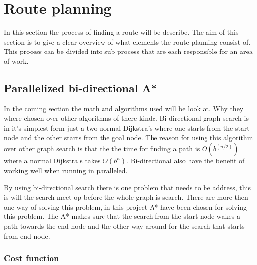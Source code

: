 \section{Route planning}
In this section the process of finding a route will be describe.
The aim of this section is to give a clear overview of what elements the route planning consist of.
This process can be divided into sub process that are each responsible for an area of work.

\subsection{Parallelized bi-directional A*} \label{algorithms}

In the coming section the math and algorithms used will be look at. Why they where chosen over other algorithms of there kinde.
Bi-directional graph search is in it's simplest form just a two normal Dijkstra’s where one starts from the start node and the other starts from the goal node.
The reason for using this algorithm over other graph search is that the the time for finding a path is $O(b^{(n/2)})$ where a normal Dijkstra’s takes $O(b^{n})$. Bi-directional also have the benefit of working well when running in paralleled.



By using bi-directional search there is one problem that needs to be address, this is will the search meet op before the whole graph is search. There are more then one way of solving this problem, in this project A* have been chosen for solving this problem. The A* makes sure that the search from the start node wakes a path towards the end node and the other way around for the search that starts from end node.



\subsubsection{Cost function}
